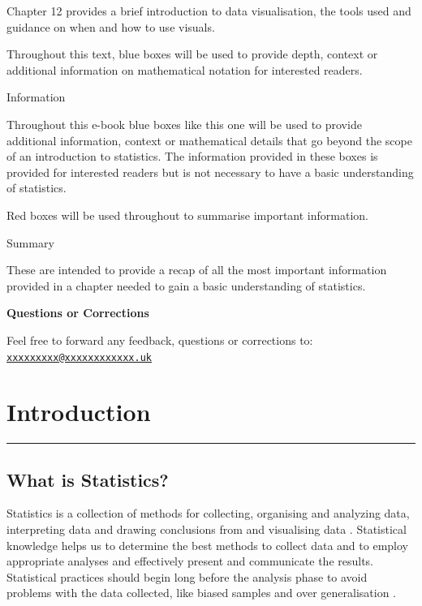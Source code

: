\documentclass[
]{book}
\begin{document}
Chapter 12 provides a brief introduction to data visualisation, the tools used and guidance on when and how to use visuals.

Throughout this text, blue boxes will be used to provide depth, context or additional information on mathematical notation for interested readers.

Information

Throughout this e-book blue boxes like this one will be used to provide additional information, context or mathematical details that go beyond the scope of an introduction to statistics. The information provided in these boxes is provided for interested readers but is not necessary to have a basic understanding of statistics.

Red boxes will be used throughout to summarise important information.

Summary

These are intended to provide a recap of all the most important information provided in a chapter needed to gain a basic understanding of statistics.

\textbf{Questions or Corrections}

Feel free to forward any feedback, questions or corrections to: \href{mailto:xxxxxxxxx@xxxxxxxxxxxx.uk}{\nolinkurl{xxxxxxxxx@xxxxxxxxxxxx.uk}}

\hypertarget{intro}{%
\chapter{Introduction}\label{intro}}

\begin{center}\rule{0.5\linewidth}{0.5pt}\end{center}

\hypertarget{what-is-statistics}{%
\section{What is Statistics?}\label{what-is-statistics}}

Statistics is a collection of methods for collecting, organising and analyzing data, interpreting data and drawing conclusions from and visualising data \citep{Witte2017}. Statistical knowledge helps us to determine the best methods to collect data and to employ appropriate analyses and effectively present and communicate the results. Statistical practices should begin long before the analysis phase to avoid problems with the data collected, like biased samples and over generalisation \citep{Frost2019}.
\end{document}
